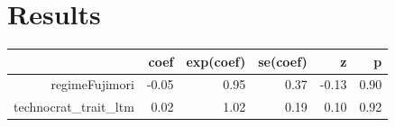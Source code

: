 \documentclass[a4paper, 12pt]{article}
\begin{document}
\section{Results}

\begin{table}[ht]
\centering
\begin{tabular}{rrrrrr}
  \hline
 & coef & exp(coef) & se(coef) & z & p \\ 
  \hline
regimeFujimori & -0.05 & 0.95 & 0.37 & -0.13 & 0.90 \\ 
  technocrat\_trait\_ltm & 0.02 & 1.02 & 0.19 & 0.10 & 0.92 \\ 
   \hline
\end{tabular}
\end{table}
\end{document}
